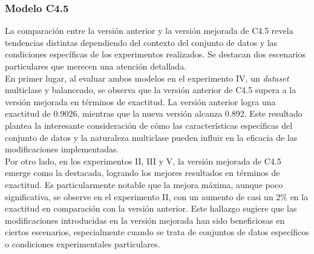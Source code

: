 \subsubsection*{Modelo C4.5}
La comparación entre la versión anterior y la versión mejorada de C4.5 revela tendencias distintas dependiendo del contexto del conjunto de datos y las condiciones específicas de los experimentos realizados. Se destacan dos escenarios particulares que merecen una atención detallada.\\
En primer lugar, al evaluar ambos modelos en el experimento IV, un \textit{dataset} multiclase y balanceado, se observa que la versión anterior de C4.5 supera a la versión mejorada en términos de exactitud. La versión anterior logra una exactitud de 0.9026, mientras que la nueva versión alcanza 0.892. Este resultado plantea la interesante consideración de cómo las características específicas del conjunto de datos y la naturaleza multiclase pueden influir en la eficacia de las modificaciones implementadas. \\
Por otro lado, en los experimentos II, III y V, la versión mejorada de C4.5 emerge como la destacada, logrando los mejores resultados en términos de exactitud. Es particularmente notable que la mejora máxima, aunque poco significativa, se observe en el experimento II, con un aumento de casi un 2\% en la exactitud en comparación con la versión anterior. Este hallazgo sugiere que las modificaciones introducidas en la versión mejorada han sido beneficiosas en ciertos escenarios, especialmente cuando se trata de conjuntos de datos específicos o condiciones experimentales particulares.

